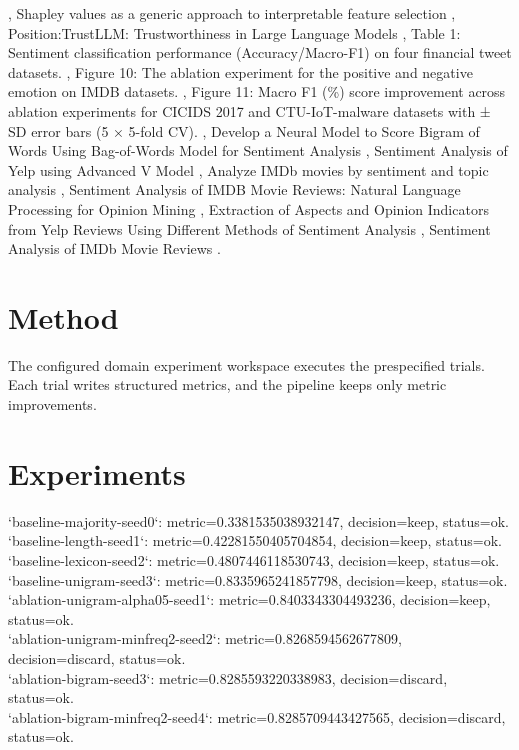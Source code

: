 \documentclass{article}
\begin{document}
\cite{cenacchi2026sparsebydesign83f7d32c}, Shapley values as a generic approach to interpretable feature selection \cite{trotskii2023shapley828133b0}, Position:TrustLLM: Trustworthiness in Large Language Models \cite{yue2024positionfd8c4283}, Table 1: Sentiment classification performance (Accuracy/Macro-F1) on four financial tweet datasets. \cite{paperndtable3751644a}, Figure 10: The ablation experiment for the positive and negative emotion on IMDB datasets. \cite{paperndfigure6b82e845}, Figure 11: Macro F1 (\%) score improvement across ablation experiments for CICIDS 2017 and CTU-IoT-malware datasets with ± SD error bars (5 × 5-fold CV). \cite{paperndfigure49caf9ce}, Develop a Neural Model to Score Bigram of Words Using Bag-of-Words Model for Sentiment Analysis \cite{balamurali2022develop3ea66269}, Sentiment Analysis of Yelp using Advanced V Model \cite{shaout2019sentiment15df16e4}, Analyze IMDb movies by sentiment and topic analysis \cite{ouyang2023analyze6d51f5aa}, Sentiment Analysis of IMDB Movie Reviews: Natural Language Processing for Opinion Mining \cite{paper2026sentiment19dab9d7}, Extraction of Aspects and Opinion Indicators from Yelp Reviews Using Different Methods of Sentiment Analysis \cite{bizel2020extraction580394cd}, Sentiment Analysis of IMDb Movie Reviews \cite{ajmera2022sentiment9a5a9e51}.

\section{Method}
The configured domain experiment workspace executes the prespecified trials.
Each trial writes structured metrics, and the pipeline keeps only metric improvements.

\section{Experiments}
\noindent `baseline-majority-seed0`: metric=0.3381535038932147, decision=keep, status=ok.\\
\noindent `baseline-length-seed1`: metric=0.42281550405704854, decision=keep, status=ok.\\
\noindent `baseline-lexicon-seed2`: metric=0.4807446118530743, decision=keep, status=ok.\\
\noindent `baseline-unigram-seed3`: metric=0.8335965241857798, decision=keep, status=ok.\\
\noindent `ablation-unigram-alpha05-seed1`: metric=0.8403343304493236, decision=keep, status=ok.\\
\noindent `ablation-unigram-minfreq2-seed2`: metric=0.8268594562677809, decision=discard, status=ok.\\
\noindent `ablation-bigram-seed3`: metric=0.8285593220338983, decision=discard, status=ok.\\
\noindent `ablation-bigram-minfreq2-seed4`: metric=0.8285709443427565, decision=discard, status=ok.\\
\end{document}
